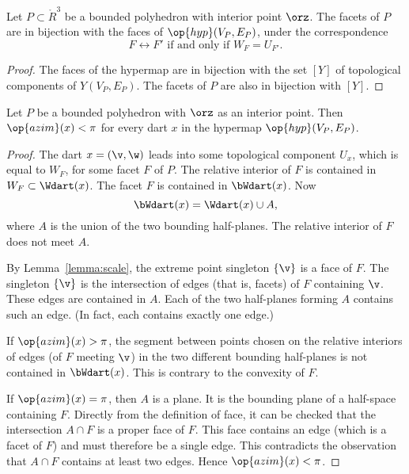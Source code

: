 \begin{lemma}[]\label{lemma:facet-bi}
Let $P\subset\ring{R}^3$ be a bounded polyhedron with interior point
$\orz$.  The facets of $P$ are in bijection with the faces of
$\op{hyp}(V_P,E_P)$, under the correspondence
\begin{displaymath}
F\leftrightarrow F' \text{ if and only if } W_F = U_{F'}.
\end{displaymath}
\end{lemma}

\begin{proof} The faces of the hypermap are in bijection with the set
$[Y]$ of topological components of $Y(V_P,E_P)$.  The facets of $P$
are also in bijection with $[Y]$.
\end{proof}

\begin{lemma}[] Let $P$ be a bounded polyhedron
with $\orz$ as an interior point.  Then $\op{azim}(x) < \pi$ for
every dart $x$ in the hypermap $\op{hyp}(V_P,E_P)$.
\end{lemma}
%
%
%
%

\begin{proof} The dart $x=(\v,\w)$ leads into some topological
component $U_x$, which is equal to $W_F$, for some facet $F$ of $P$.
The relative interior of $F$ is contained in $W_F\subset \Wdart(x)$.
The facet $F$ is contained in $\bWdart(x)$. Now
\begin{displaymath}
\bWdart(x) = \Wdart(x)\cup A,
\end{displaymath}
where $A$ is the union of the two bounding half-planes.  The relative
interior of $F$ does not meet $A$.

By Lemma~\ref{lemma:scale}, the extreme point singleton $\{\v\}$ is a face of $F$.  The
singleton $\{\v\}$ is the intersection of edges (that is, facets) of $F$
containing $\v$.  These edges are contained in $A$.  Each of the two
half-planes forming $A$ contains such an edge. (In fact, each contains
exactly one edge.)  %
%
%
%

If $\op{azim}(x)>\pi$, the segment between points chosen on the
relative interiors of edges (of $F$ meeting $\v$) in the two different
bounding half-planes is not contained in $\bWdart(x)$.  This is
contrary to the convexity of $F$.  %
%

If $\op{azim}(x)=\pi$, then $A$ is a plane.  It is the bounding plane
of a half-space containing $F$.  Directly from the definition of face,
it can be checked that the intersection $A\cap F$ is a proper face of
$F$.  This face contains an edge (which is a facet of $F$) and must
therefore be a single edge.  This contradicts the observation that
$A\cap F$ contains at least two edges.  Hence $\op{azim}(x)<\pi$.
\end{proof}


